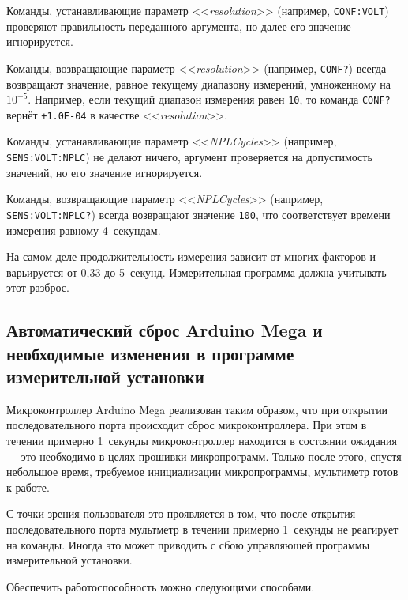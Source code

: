 \documentclass[12pt, a4paper]{article}
\newcommand{\Arduino}{Arduino Mega}
\newcommand{\CMD}[1]{{\tt #1}}
\newcommand{\PARAM}[1]{<<{\it #1}>>}
\begin{document}
Команды, устанавливающие параметр \PARAM{resolution} (например, \CMD{CONF:VOLT}) проверяют правильность переданного аргумента, но далее его значение игнорируется.

Команды, возвращающие параметр \PARAM{resolution} (например, \CMD{CONF?}) всегда возвращают значение, равное текущему диапазону измерений, умноженному на $10^{-5}$. Например, если текущий диапазон измерения равен \CMD{10}, то команда \CMD{CONF?} вернёт \CMD{+1.0E-04} в качестве \PARAM{resolution}.

Команды, устанавливающие параметр \PARAM{NPLCycles} (например, \CMD{SENS:VOLT:NPLC}) не делают ничего, аргумент  проверяется на допустимость значений, но его значение игнорируется.

Команды, возвращающие параметр \PARAM{NPLCycles} (например, \CMD{SENS:VOLT:NPLC?}) всегда возвращают значение \CMD{100}, что соответствует времени измерения равному 4~секундам.

На самом деле продолжительность измерения зависит от многих факторов и варьируется от 0,33 до 5~секунд. Измерительная программа должна учитывать этот разброс.

\subsection{Автоматический сброс {\Arduino} и необходимые изменения в программе измерительной установки}

Микроконтроллер {\Arduino} реализован таким образом, что при открытии последовательного порта происходит сброс микроконтроллера. При этом в течении примерно 1~секунды микроконтроллер находится в состоянии ожидания --- это необходимо в целях прошивки микропрограмм. Только после этого, спустя небольшое время, требуемое инициализации микропрограммы, мультиметр готов к работе.

С точки зрения пользователя это проявляется в том, что после открытия последовательного порта мультметр в течении примерно 1~секунды не реагирует на команды. Иногда это может приводить с сбою управляющей программы измерительной установки.

Обеспечить работоспособность можно следующими способами.
\end{document}
